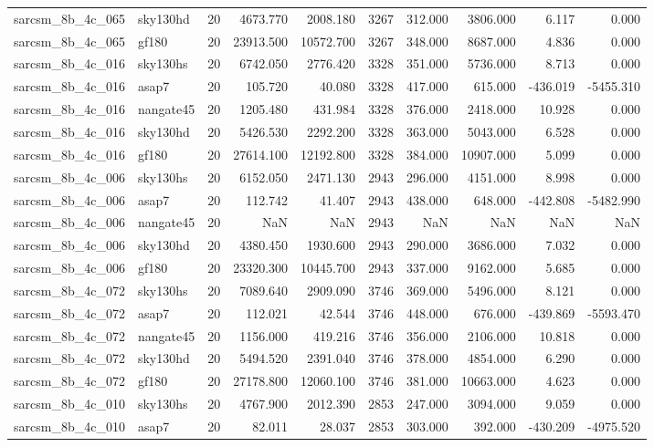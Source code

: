 \begin{tabular}{llrrrrrrrr}
sarcsm\_8b\_4c\_065 & sky130hd & 20 & 4673.770 & 2008.180 & 3267 & 312.000 & 3806.000 & 6.117 & 0.000 \\
sarcsm\_8b\_4c\_065 & gf180 & 20 & 23913.500 & 10572.700 & 3267 & 348.000 & 8687.000 & 4.836 & 0.000 \\
sarcsm\_8b\_4c\_016 & sky130hs & 20 & 6742.050 & 2776.420 & 3328 & 351.000 & 5736.000 & 8.713 & 0.000 \\
sarcsm\_8b\_4c\_016 & asap7 & 20 & 105.720 & 40.080 & 3328 & 417.000 & 615.000 & -436.019 & -5455.310 \\
sarcsm\_8b\_4c\_016 & nangate45 & 20 & 1205.480 & 431.984 & 3328 & 376.000 & 2418.000 & 10.928 & 0.000 \\
sarcsm\_8b\_4c\_016 & sky130hd & 20 & 5426.530 & 2292.200 & 3328 & 363.000 & 5043.000 & 6.528 & 0.000 \\
sarcsm\_8b\_4c\_016 & gf180 & 20 & 27614.100 & 12192.800 & 3328 & 384.000 & 10907.000 & 5.099 & 0.000 \\
sarcsm\_8b\_4c\_006 & sky130hs & 20 & 6152.050 & 2471.130 & 2943 & 296.000 & 4151.000 & 8.998 & 0.000 \\
sarcsm\_8b\_4c\_006 & asap7 & 20 & 112.742 & 41.407 & 2943 & 438.000 & 648.000 & -442.808 & -5482.990 \\
sarcsm\_8b\_4c\_006 & nangate45 & 20 & NaN & NaN & 2943 & NaN & NaN & NaN & NaN \\
sarcsm\_8b\_4c\_006 & sky130hd & 20 & 4380.450 & 1930.600 & 2943 & 290.000 & 3686.000 & 7.032 & 0.000 \\
sarcsm\_8b\_4c\_006 & gf180 & 20 & 23320.300 & 10445.700 & 2943 & 337.000 & 9162.000 & 5.685 & 0.000 \\
sarcsm\_8b\_4c\_072 & sky130hs & 20 & 7089.640 & 2909.090 & 3746 & 369.000 & 5496.000 & 8.121 & 0.000 \\
sarcsm\_8b\_4c\_072 & asap7 & 20 & 112.021 & 42.544 & 3746 & 448.000 & 676.000 & -439.869 & -5593.470 \\
sarcsm\_8b\_4c\_072 & nangate45 & 20 & 1156.000 & 419.216 & 3746 & 356.000 & 2106.000 & 10.818 & 0.000 \\
sarcsm\_8b\_4c\_072 & sky130hd & 20 & 5494.520 & 2391.040 & 3746 & 378.000 & 4854.000 & 6.290 & 0.000 \\
sarcsm\_8b\_4c\_072 & gf180 & 20 & 27178.800 & 12060.100 & 3746 & 381.000 & 10663.000 & 4.623 & 0.000 \\
sarcsm\_8b\_4c\_010 & sky130hs & 20 & 4767.900 & 2012.390 & 2853 & 247.000 & 3094.000 & 9.059 & 0.000 \\
sarcsm\_8b\_4c\_010 & asap7 & 20 & 82.011 & 28.037 & 2853 & 303.000 & 392.000 & -430.209 & -4975.520 \\

\end{tabular}
